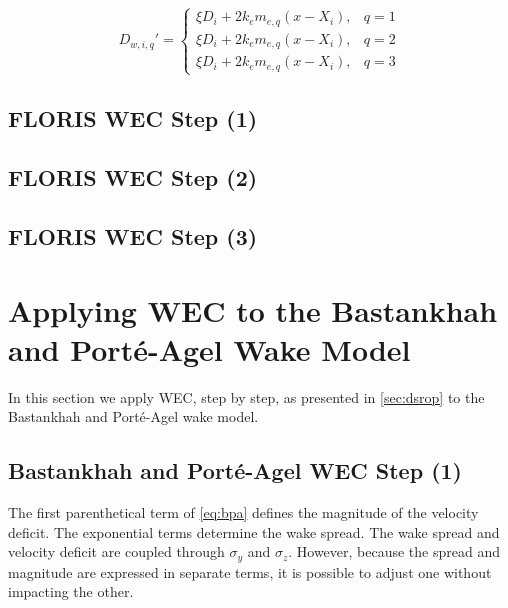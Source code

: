\documentclass[a4paper]{jpconf}
\begin{document}
\begin{equation}
    D_{w, i, q}' = \begin{cases}
        \xi D_i + 2k_em_{e, q} (x - X_i), & q = 1 \\
        \xi D_i + 2k_em_{e, q} (x - X_i), & q = 2 \\
        \xi D_i + 2k_em_{e, q} (x - X_i), & q = 3
    \end{cases}
    \label{eq:FLORISWECWakeDiameterPiecewise}
\end{equation}

\subsection{FLORIS WEC Step (1)}
\subsection{FLORIS WEC Step (2)}
\subsection{FLORIS WEC Step (3)}

\section{Applying WEC to the Bastankhah and Port\'e-Agel Wake Model}
In this section we apply WEC, step by step, as presented in \cref{sec:dsrop} to the Bastankhah and Port\'e-Agel wake model.  

\subsection{Bastankhah and Port\'e-Agel WEC Step (1)}
The first parenthetical term of \cref{eq:bpa} defines the magnitude of the velocity deficit. The exponential terms determine the wake spread. The wake spread and velocity deficit are coupled through $\sigma_y$ and $\sigma_z$. However, because the spread and magnitude are expressed in separate terms, it is possible to adjust one without impacting the other. 
\end{document}
